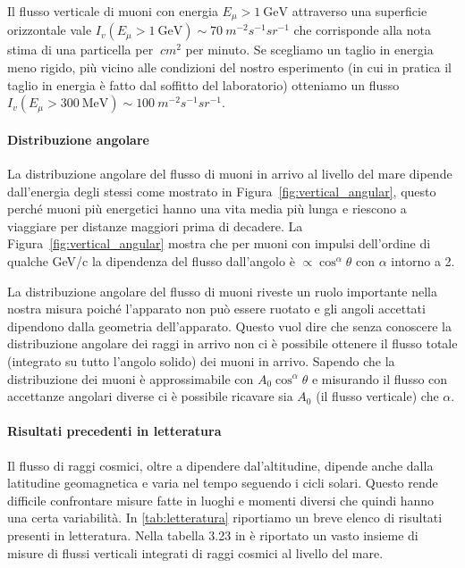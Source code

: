 Il flusso verticale di muoni con energia $E_{\mu} > \SI{1}{\GeV}$ attraverso una superficie orizzontale vale $I_v(E_{\mu} > \SI{1}{\GeV}) \sim \SI{70}{m^{-2} s^{-1} sr^{-1}}$ che corrisponde alla nota stima di una particella per $\SI{}{cm^2}$ per minuto. Se scegliamo un taglio in energia meno rigido, più vicino alle condizioni del nostro esperimento (in cui in pratica il taglio in energia è fatto dal soffitto del laboratorio) otteniamo un flusso $I_v(E_{\mu} > \SI{300}{\MeV}) \sim \SI{100}{m^{-2} s^{-1} sr^{-1}}$.

\paragraph{Distribuzione angolare}

La distribuzione angolare del flusso di muoni in arrivo al livello del mare dipende dall'energia degli stessi come mostrato in Figura~\ref{fig:vertical_angular}, questo perché muoni più energetici hanno una vita media più lunga e riescono a viaggiare per distanze maggiori prima di decadere.
La Figura~\ref{fig:vertical_angular} mostra che per muoni con impulsi dell'ordine di qualche GeV/c la dipendenza del flusso dall'angolo è $\propto \cos^\alpha\theta$ con $\alpha$ intorno a 2.

La distribuzione angolare del flusso di muoni riveste un ruolo importante nella nostra misura poiché l'apparato non può essere ruotato e gli angoli accettati dipendono dalla geometria dell'apparato. Questo vuol dire che senza conoscere la distribuzione angolare dei raggi in arrivo non ci è possibile ottenere il flusso totale (integrato su tutto l'angolo solido) dei muoni in arrivo. Sapendo che la distribuzione dei muoni è approssimabile con $A_0 \cos^\alpha\theta$ e misurando il flusso con accettanze angolari diverse ci è possibile ricavare sia $A_0$ (il flusso verticale) che $\alpha$.

\paragraph{Risultati precedenti in letteratura}

Il flusso di raggi cosmici, oltre a dipendere dal'altitudine, dipende anche dalla latitudine geomagnetica e varia nel tempo seguendo i cicli solari. Questo rende difficile confrontare misure fatte in luoghi e momenti diversi che quindi hanno una certa variabilità.
In \autoref{tab:letteratura} riportiamo un breve elenco di risultati presenti in letteratura. Nella tabella 3.23 in \cite{7}  è riportato un vasto insieme di misure di flussi verticali integrati di raggi cosmici al livello del mare.


